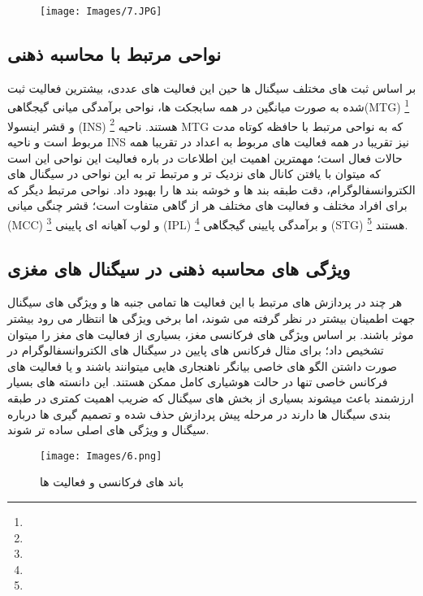 \documentclass[11pt]{extarticle}
\begin{document}
\begin{figure}[h!]
	\centering
	\texttt{[image: Images/7.JPG]}
	\caption{}
	\label{fig:15}
\end{figure}

\subsection{نواحی مرتبط با محاسبه ذهنی}

 بر اساس ثبت های مختلف سیگنال ها حین این فعالیت های عددی، بیشترین فعالیت ثبت شده به صورت میانگین در همه سابجکت ها، نواحی برآمدگی میانی گیجگاهی(MTG)
\footnote{}
و قشر اینسولا (INS)
\footnote{}
هستند. ناحیه MTG که به نواحی مرتبط با حافظه کوتاه مدت مربوط است و ناحیه INS نیز تقریبا در همه فعالیت های مربوط به اعداد در تقریبا همه حالات فعال است؛ مهمترین اهمیت این اطلاعات در باره فعالیت این نواحی این است که میتوان با یافتن کانال های نزدیک تر و مرتبط تر به این نواحی در سیگنال های الکتروانسفالوگرام، دقت طبقه بند ها و خوشه بند ها را بهبود داد. نواحی مرتبط دیگر که برای افراد مختلف و فعالیت های مختلف هر از گاهی متفاوت است؛ قشر چنگی میانی (MCC)
\footnote{}
و لوب آهیانه ای پایینی (IPL)
\footnote{}
 و برآمدگی پایینی گیجگاهی (STG)
\footnote{}
  هستند.

\subsection{ویژگی های محاسبه ذهنی در سیگنال های مغزی}

هر چند در پردازش های مرتبط با این فعالیت ها تمامی جنبه ها و ویژگی های سیگنال جهت اطمینان بیشتر در نظر گرفته می شوند، اما برخی ویژگی ها انتظار می رود بیشتر موثر باشند. بر اساس ویژگی های فرکانسی مغز، بسیاری از فعالیت های مغز را میتوان تشخیص داد؛ برای مثال فرکانس های پایین در سیگنال های الکتروانسفالوگرام در صورت داشتن الگو های خاصی بیانگر ناهنجاری هایی میتوانند باشند و یا فعالیت های فرکانس خاصی تنها در حالت هوشیاری کامل ممکن هستند. این دانسته های بسیار ارزشمند باعث میشوند بسیاری از بخش های سیگنال که ضریب اهمیت کمتری در طبقه بندی سیگنال ها دارند در مرحله پیش پردازش حذف شده و تصمیم گیری ها درباره سیگنال و ویژگی های اصلی ساده تر شوند. 

\begin{figure}[hb!]
	\centering
	\texttt{[image: Images/6.png]}
	\caption{باند های فرکانسی و فعالیت ها}
	\label{fig:16}
\end{figure}
\end{document}
